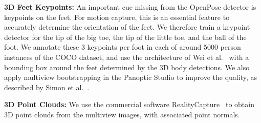\textbf{3D Feet Keypoints:} An important cue missing from the OpenPose detector is keypoints on the feet. For motion capture, this is an essential feature to accurately determine the orientation of the feet. We therefore train a keypoint detector for the tip of the big toe, the tip of the little toe, and the ball of the foot. We annotate these 3 keypoints per foot in each of around 5000 person instances of the COCO dataset, and use the architecture of Wei et al.~\cite{Wei2016} with a bounding box around the feet determined by the 3D body detections. We also apply multiview bootstrapping in the Panoptic Studio to improve the quality, as described by Simon et al.~\cite{simon2017hand}.%


%
%
%

\textbf{3D Point Clouds:} We use the commercial software RealityCapture~\cite{RealityCapture} to obtain 3D point clouds from the multiview images, with associated point normals.

	

